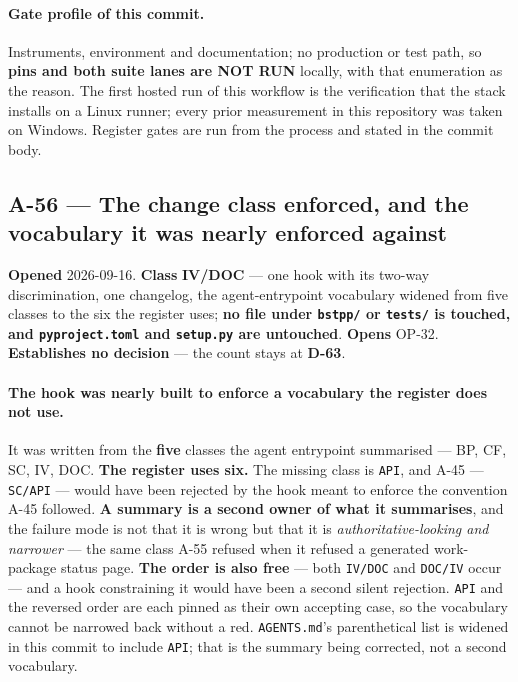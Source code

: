 \documentclass[
  10pt,
]{article}
\begin{document}
\paragraph{Gate profile of this commit.}
Instruments, environment and documentation; no production or test path, so
\textbf{pins and both suite lanes are NOT RUN} locally, with that enumeration
as the reason. The first hosted run of this workflow is the verification that
the stack installs on a Linux runner; every prior measurement in this
repository was taken on Windows. Register gates are run from the process and
stated in the commit body.

\hypertarget{a-56}{%
\subsection{A-56 --- The change class enforced, and the vocabulary it was nearly
enforced against}\label{a-56}}

\textbf{Opened} 2026-09-16. \textbf{Class} \textbf{IV/DOC} --- one hook with its
two-way discrimination, one changelog, the agent-entrypoint vocabulary widened
from five classes to the six the register uses; \textbf{no file under
\texttt{bstpp/} or \texttt{tests/} is touched, and \texttt{pyproject.toml} and
\texttt{setup.py} are untouched}. \textbf{Opens} OP-32. \textbf{Establishes no
decision} --- the count stays at \textbf{D-63}.

\paragraph{The hook was nearly built to enforce a vocabulary the register does not use.}
It was written from the \textbf{five} classes the agent entrypoint summarised
--- BP, CF, SC, IV, DOC. \textbf{The register uses six.} The missing class is
\texttt{API}, and A-45 --- \texttt{SC/API} --- would have been rejected by the
hook meant to enforce the convention A-45 followed. \textbf{A summary is a
second owner of what it summarises}, and the failure mode is not that it is
wrong but that it is \emph{authoritative-looking and narrower} --- the same
class A-55 refused when it refused a generated work-package status page.
\textbf{The order is also free} --- both \texttt{IV/DOC} and \texttt{DOC/IV}
occur --- and a hook constraining it would have been a second silent rejection.
\texttt{API} and the reversed order are each pinned as their own accepting case,
so the vocabulary cannot be narrowed back without a red. \texttt{AGENTS.md}'s
parenthetical list is widened in this commit to include \texttt{API}; that is
the summary being corrected, not a second vocabulary.
\end{document}
